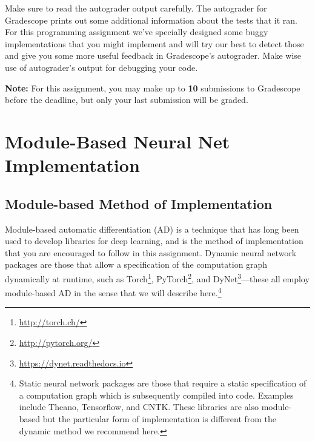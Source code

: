 \documentclass[11pt,addpoints,answers]{exam}
\begin{document}
Make sure to read the autograder output carefully. The autograder for Gradescope prints out some additional information about the tests that it ran. For this programming assignment we've specially designed some buggy implementations that you might implement and will try our best to detect those and give you some more useful feedback in Gradescope's autograder. Make wise use of autograder's output for debugging your code.

\textbf{Note:} For this assignment, you may make up to \textbf{10} submissions to Gradescope before the deadline, but only your last submission will be graded.

\newpage

\section{Module-Based Neural Net Implementation}

\subsection{Module-based Method of Implementation}
\label{sec:modulebased}

Module-based automatic differentiation (AD) is a technique that has long been used to develop libraries for deep learning, and is the method of implementation that you are encouraged to follow in this assignment. Dynamic neural network packages are those that allow a specification of the computation graph dynamically at runtime, such as Torch\footnote{\url{http://torch.ch/}}, PyTorch\footnote{\url{http://pytorch.org/}}, and DyNet\footnote{\url{https://dynet.readthedocs.io}}---these all employ module-based AD in the sense that we will describe here.\footnote{Static neural network packages are those that require a static specification of a computation graph which is subsequently compiled into code. Examples include Theano, Tensorflow, and CNTK. These libraries are also module-based but the particular form of implementation is different from the dynamic method we recommend here.}
\end{document}
